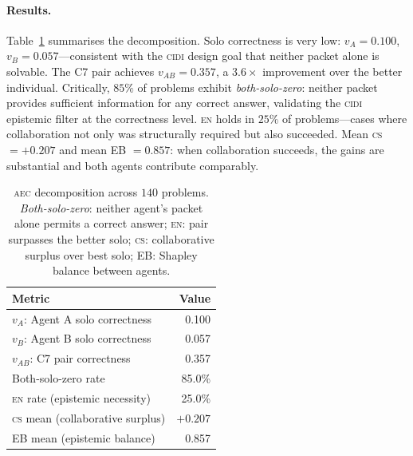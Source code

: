 \documentclass{article}
\newcommand{\CIDI}{\textsc{cidi}}
\newcommand{\AEC}{\textsc{aec}}
\newcommand{\EN}{\textsc{en}}
\newcommand{\CS}{\textsc{cs}}
\begin{document}
\paragraph{Results.}
Table~\ref{tab:aec} summarises the decomposition. Solo correctness is
very low: $v_A = 0.100$, $v_B = 0.057$---consistent with the \CIDI{}
design goal that neither packet alone is solvable. The C7 pair achieves
$v_{AB} = 0.357$, a $3.6\times$ improvement over the better individual.
Critically, $85\%$ of problems exhibit \emph{both-solo-zero}: neither
packet provides sufficient information for any correct answer, validating
the \CIDI{} epistemic filter at the correctness level. \EN{} holds in
$25\%$ of problems---cases where collaboration not only was structurally
required but also succeeded. Mean \CS{} $= +0.207$ and mean EB $=
0.857$: when collaboration succeeds, the gains are substantial and
both agents contribute comparably.

\begin{table}[t]
  \caption{\AEC{} decomposition across $140$ problems. \emph{Both-solo-zero}:
  neither agent's packet alone permits a correct answer; \EN: pair
  surpasses the better solo; \CS: collaborative surplus over best solo;
  EB: Shapley balance between agents.}
  \label{tab:aec}
  \centering
  \begin{tabular}{lr}
    \toprule
    \textbf{Metric} & \textbf{Value} \\
    \midrule
    $v_A$: Agent A solo correctness  & 0.100 \\
    $v_B$: Agent B solo correctness  & 0.057 \\
    $v_{AB}$: C7 pair correctness    & 0.357 \\
    \midrule
    Both-solo-zero rate              & 85.0\% \\
    \EN{} rate (epistemic necessity) & 25.0\% \\
    \CS{} mean (collaborative surplus)  & $+0.207$ \\
    EB mean (epistemic balance)      & 0.857  \\
    \bottomrule
  \end{tabular}
\end{table}
\end{document}
